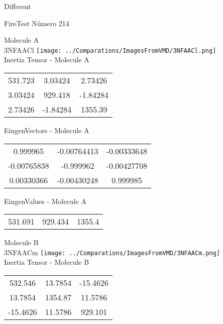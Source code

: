 \begin{center}
\vtab
\vtab
\textcolor{NavyBlue}{\Large Different}
\end{center}

 \newpage

\vtab[-2cm]
\begin{center}
{\large FireTest \tab Número 214}
\end{center}
\begin{multicols}{2}
\begin{center}

Molecule A \\ 
3NFAACl
\texttt{[image: ../Comparations/ImagesFromVMD/3NFAACl.png]}
\\
Inertia Tensor - Molecule A \\
\vtab

\begin{tabular}{|c c c|}
531.723	 & 	3.03424	 & 	2.73426	 \\
3.03424	 & 	929.418	 & 	-1.84284	 \\
2.73426	 & 	-1.84284	 & 	1355.39
\end{tabular}

\vtab
 EingenVectors - Molecule A     \\
\vtab
\begin{tabular}{|c c c|}
0.999965	 & 	-0.00764413	 & 	-0.00333648	 \\
-0.00765838	 & 	-0.999962	 & 	-0.00427708	 \\
0.00330366	 & 	-0.00430248	 & 	0.999985
\end{tabular}

\vtab
 EingenValues - Molecule A     \\
\vtab
\begin{tabular}{|c c c|}
531.691	 & 	929.434	 & 	1355.4	 \\
\end{tabular}
\columnbreak

Molecule B \\ 
3NFAACm
\texttt{[image: ../Comparations/ImagesFromVMD/3NFAACm.png]}
\\
Inertia Tensor - Molecule B \\
\vtab

\begin{tabular}{|c c c|}
532.546	 & 	13.7854	 & 	-15.4626	 \\
13.7854	 & 	1354.87	 & 	11.5786	 \\
-15.4626	 & 	11.5786	 & 	929.101
\end{tabular}


\end{center}
\end{multicols}
